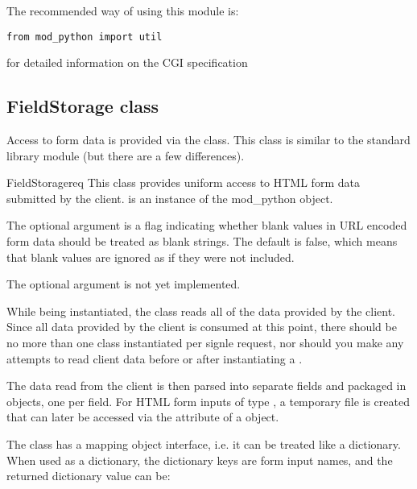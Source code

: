 The recommended way of using this module is:
\begin{verbatim}
from mod_python import util
\end{verbatim}

\begin{seealso}
	{for detailed information on the CGI specification}
\end{seealso}

\subsection{FieldStorage class\label{pyapi-util-fstor}}

Access to form data is provided via the 
class. This class is similar to the standard library module 
 (but there are a few differences).

\begin{classdesc}{FieldStorage}{req}
This class provides uniform access to HTML form data submitted by the client.
 is an instance of the mod_python  object.

The optional argument  is a flag indicating whether
blank values in URL encoded form data should be treated as blank strings. The
default is false, which means that blank values are ignored as if they were
not included.

The optional argument  is not yet implemented.
\end{classdesc}

While being instantiated, the  class reads all of
the data provided by the client. Since all data provided by the client
is consumed at this point, there should be no more than one
 class instantiated per signle request, nor should
you make any attempts to read client data before or after
instantiating a .

The data read from the client is then parsed into separate fields
and packaged in  objects, one per field. For HTML form
inputs of type , a temporary file is created that can later be 
accessed via the  attribute of a  object.

The  class has a mapping object interface, i.e. it
can be treated like a dictionary. When used as a dictionary, the dictionary 
keys are form input names, and the returned dictionary value can be:


